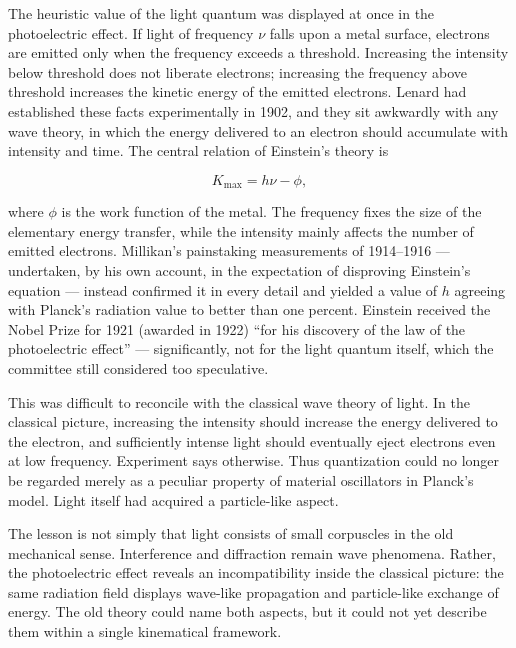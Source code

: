 The heuristic value of the light quantum was displayed at once in the photoelectric effect. If light of frequency $\nu$ falls upon a metal surface, electrons are emitted only when the frequency exceeds a threshold. Increasing the intensity below threshold does not liberate electrons; increasing the frequency above threshold increases the kinetic energy of the emitted electrons. Lenard had established these facts experimentally in 1902, and they sit awkwardly with any wave theory, in which the energy delivered to an electron should accumulate with intensity and time. The central relation of Einstein's theory is
\begin{linenomath}
    \begin{equation}
        K_{\max}=h\nu-\phi,
    \end{equation}
\end{linenomath}
where $\phi$ is the work function of the metal. The frequency fixes the size of the elementary energy transfer, while the intensity mainly affects the number of emitted electrons. Millikan's painstaking measurements of 1914--1916 --- undertaken, by his own account, in the expectation of disproving Einstein's equation --- instead confirmed it in every detail and yielded a value of $h$ agreeing with Planck's radiation value to better than one percent. Einstein received the Nobel Prize for 1921 (awarded in 1922) ``for his discovery of the law of the photoelectric effect'' --- significantly, not for the light quantum itself, which the committee still considered too speculative.

This was difficult to reconcile with the classical wave theory of light. In the classical picture, increasing the intensity should increase the energy delivered to the electron, and sufficiently intense light should eventually eject electrons even at low frequency. Experiment says otherwise. Thus quantization could no longer be regarded merely as a peculiar property of material oscillators in Planck's model. Light itself had acquired a particle-like aspect.

The lesson is not simply that light consists of small corpuscles in the old mechanical sense. Interference and diffraction remain wave phenomena. Rather, the photoelectric effect reveals an incompatibility inside the classical picture: the same radiation field displays wave-like propagation and particle-like exchange of energy. The old theory could name both aspects, but it could not yet describe them within a single kinematical framework.

